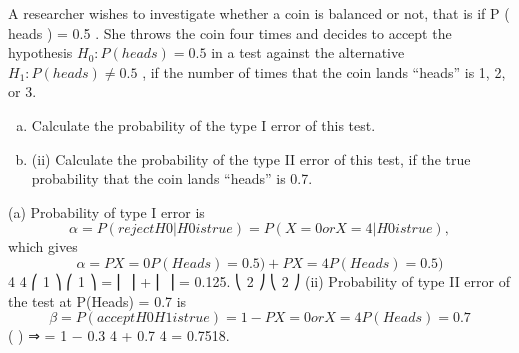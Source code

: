 \documentclass[a4paper,12pt]{article}
\begin{document}
A researcher wishes to investigate whether a coin is balanced or not, that is if P ( heads ) = 0.5 . She throws the coin four times and decides to accept the hypothesis $H_0 : P ( heads ) = 0.5$ in a test against the alternative $H_1 : P ( heads ) \neq 0.5 $ , if the number
of times that the coin lands “heads” is 1, 2, or 3.
\begin{enumerate}[(a)]
\item  Calculate the probability of the type I error of this test.

\item (ii) Calculate the probability of the type II error of this test, if the true probability
that the coin lands “heads” is 0.7.

\end{enumerate}

(a)
Probability of type I error is
\[\alpha = P (reject H 0 | H 0 is true) = P ( X = 0 or X = 4 | H 0 is true) ,\]
which gives
\[\alpha = P { X = 0 P ( Heads ) = 0.5)} + P { X = 4 P ( Heads ) = 0.5)}\]
4
4
⎛ 1 ⎞ ⎛ 1 ⎞
= ⎜ ⎟ + ⎜ ⎟ = 0.125.
⎝ 2 ⎠ ⎝ 2 ⎠
(ii)
Probability of type II error of the test at P(Heads) = 0.7 is
\[ \beta = P (accept H 0 H 1 is true) = 1 − P { X = 0 or X = 4 P ( Heads ) = 0.7}\]
(
)
⇒ \beta = 1 − 0.3 4 + 0.7 4 = 0.7518.

\end{document}
